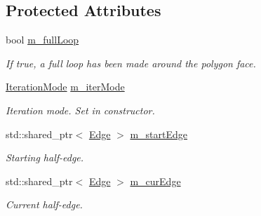 \subsection*{Protected Attributes}
\begin{DoxyCompactItemize}
\item 
\mbox{\label{classDcel_1_1EdgeIteratorT_a39560da0f4479c53ed27c38bdfab7c21}} 
bool \hyperlink{classDcel_1_1EdgeIteratorT_a39560da0f4479c53ed27c38bdfab7c21}{m\+\_\+full\+Loop}
\begin{DoxyCompactList}\small\item\em If true, a full loop has been made around the polygon face. \end{DoxyCompactList}\item 
\mbox{\label{classDcel_1_1EdgeIteratorT_aa0c8a35a18d668927dd966ddd9620ce5}} 
\hyperlink{classDcel_1_1EdgeIteratorT_ad6b36e4ef39214ccd75966a6ecd82682}{Iteration\+Mode} \hyperlink{classDcel_1_1EdgeIteratorT_aa0c8a35a18d668927dd966ddd9620ce5}{m\+\_\+iter\+Mode}
\begin{DoxyCompactList}\small\item\em Iteration mode. Set in constructor. \end{DoxyCompactList}\item 
\mbox{\label{classDcel_1_1EdgeIteratorT_a39c525d750868014457cdf06a40455bd}} 
std\+::shared\+\_\+ptr$<$ \hyperlink{classDcel_1_1EdgeIteratorT_ab65ac3b39da5eeb9e3e795f62647ac0b}{Edge} $>$ \hyperlink{classDcel_1_1EdgeIteratorT_a39c525d750868014457cdf06a40455bd}{m\+\_\+start\+Edge}
\begin{DoxyCompactList}\small\item\em Starting half-\/edge. \end{DoxyCompactList}\item 
\mbox{\label{classDcel_1_1EdgeIteratorT_afcebe87fbd158d212d7ba0a6b01efa8c}} 
std\+::shared\+\_\+ptr$<$ \hyperlink{classDcel_1_1EdgeIteratorT_ab65ac3b39da5eeb9e3e795f62647ac0b}{Edge} $>$ \hyperlink{classDcel_1_1EdgeIteratorT_afcebe87fbd158d212d7ba0a6b01efa8c}{m\+\_\+cur\+Edge}
\begin{DoxyCompactList}\small\item\em Current half-\/edge. \end{DoxyCompactList}\end{DoxyCompactItemize}


